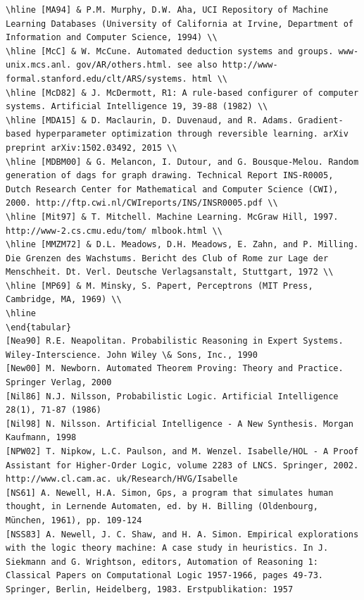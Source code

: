 \documentclass[10pt]{book}
\begin{document}
\begin{center}
\begin{enumerate}
\begin{center}
\begin{center}
\begin{center}
\begin{center}
\begin{center}
\begin{verbatim}
\hline [MA94] & P.M. Murphy, D.W. Aha, UCI Repository of Machine Learning Databases (University of California at Irvine, Department of Information and Computer Science, 1994) \\
\hline [McC] & W. McCune. Automated deduction systems and groups. www-unix.mcs.anl. gov/AR/others.html. see also http://www-formal.stanford.edu/clt/ARS/systems. html \\
\hline [McD82] & J. McDermott, R1: A rule-based configurer of computer systems. Artificial Intelligence 19, 39-88 (1982) \\
\hline [MDA15] & D. Maclaurin, D. Duvenaud, and R. Adams. Gradient-based hyperparameter optimization through reversible learning. arXiv preprint arXiv:1502.03492, 2015 \\
\hline [MDBM00] & G. Melancon, I. Dutour, and G. Bousque-Melou. Random generation of dags for graph drawing. Technical Report INS-R0005, Dutch Research Center for Mathematical and Computer Science (CWI), 2000. http://ftp.cwi.nl/CWIreports/INS/INSR0005.pdf \\
\hline [Mit97] & T. Mitchell. Machine Learning. McGraw Hill, 1997. http://www-2.cs.cmu.edu/tom/ mlbook.html \\
\hline [MMZM72] & D.L. Meadows, D.H. Meadows, E. Zahn, and P. Milling. Die Grenzen des Wachstums. Bericht des Club of Rome zur Lage der Menschheit. Dt. Verl. Deutsche Verlagsanstalt, Stuttgart, 1972 \\
\hline [MP69] & M. Minsky, S. Papert, Perceptrons (MIT Press, Cambridge, MA, 1969) \\
\hline
\end{tabular}
[Nea90] R.E. Neapolitan. Probabilistic Reasoning in Expert Systems. Wiley-Interscience. John Wiley \& Sons, Inc., 1990
[New00] M. Newborn. Automated Theorem Proving: Theory and Practice. Springer Verlag, 2000
[Nil86] N.J. Nilsson, Probabilistic Logic. Artificial Intelligence 28(1), 71-87 (1986)
[Nil98] N. Nilsson. Artificial Intelligence - A New Synthesis. Morgan Kaufmann, 1998
[NPW02] T. Nipkow, L.C. Paulson, and M. Wenzel. Isabelle/HOL - A Proof Assistant for Higher-Order Logic, volume 2283 of LNCS. Springer, 2002. http://www.cl.cam.ac. uk/Research/HVG/Isabelle
[NS61] A. Newell, H.A. Simon, Gps, a program that simulates human thought, in Lernende Automaten, ed. by H. Billing (Oldenbourg, München, 1961), pp. 109-124
[NSS83] A. Newell, J. C. Shaw, and H. A. Simon. Empirical explorations with the logic theory machine: A case study in heuristics. In J. Siekmann and G. Wrightson, editors, Automation of Reasoning 1: Classical Papers on Computational Logic 1957-1966, pages 49-73. Springer, Berlin, Heidelberg, 1983. Erstpublikation: 1957

\end{verbatim}
\end{center}
\end{center}
\end{center}
\end{center}
\end{center}
\end{enumerate}
\end{center}
\end{document}
